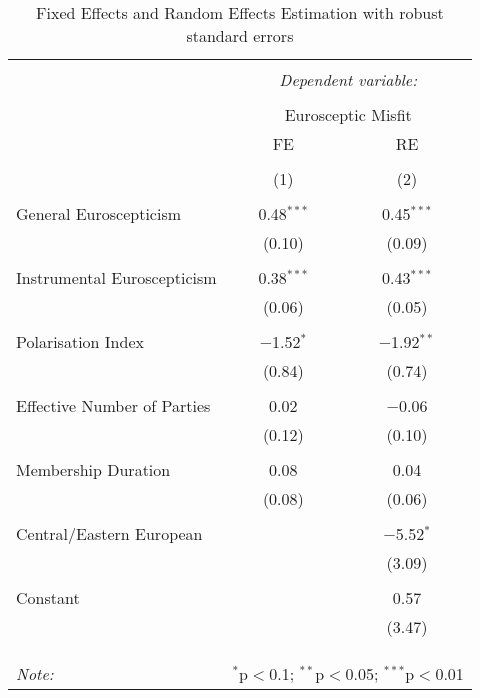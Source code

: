 
\begin{table}[!htbp] \centering 
  \caption{Fixed Effects and Random Effects Estimation with robust standard errors} 
  \label{tab: results} 
\begin{tabular}{@{\extracolsep{5pt}}lcc} 
\\[-1.8ex]\hline 
\hline \\[-1.8ex] 
 & \multicolumn{2}{c}{\textit{Dependent variable:}} \\ 
\cline{2-3} 
\\[-1.8ex] & \multicolumn{2}{c}{Eurosceptic Misfit} \\ 
 & FE & RE \\ 
\\[-1.8ex] & (1) & (2)\\ 
\hline \\[-1.8ex] 
 General Euroscepticism & 0.48$^{***}$ & 0.45$^{***}$ \\ 
  & (0.10) & (0.09) \\ 
  & & \\ 
 Instrumental Euroscepticism & 0.38$^{***}$ & 0.43$^{***}$ \\ 
  & (0.06) & (0.05) \\ 
  & & \\ 
 Polarisation Index & $-$1.52$^{*}$ & $-$1.92$^{**}$ \\ 
  & (0.84) & (0.74) \\ 
  & & \\ 
 Effective Number of Parties & 0.02 & $-$0.06 \\ 
  & (0.12) & (0.10) \\ 
  & & \\ 
 Membership Duration & 0.08 & 0.04 \\ 
  & (0.08) & (0.06) \\ 
  & & \\ 
 Central/Eastern European &  & $-$5.52$^{*}$ \\ 
  &  & (3.09) \\ 
  & & \\ 
 Constant &  & 0.57 \\ 
  &  & (3.47) \\ 
  & & \\ 
\hline \\[-1.8ex] 
\hline 
\hline \\[-1.8ex] 
\textit{Note:}  & \multicolumn{2}{r}{$^{*}$p$<$0.1; $^{**}$p$<$0.05; $^{***}$p$<$0.01} \\ 
\end{tabular} 
\end{table} 
